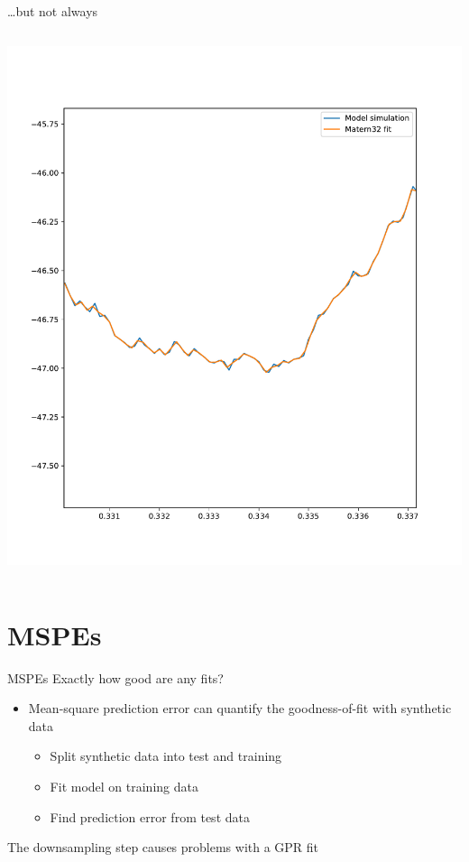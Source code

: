 \documentclass[presentation]{beamer}
\begin{document}
\begin{frame}[plain,label={sec:org973ac53}]{\ldots{}but not always}
\begin{columns}
\begin{column}{0.5\columnwidth}
\begin{center}
\includegraphics[width=1.1\textwidth]{./Matern6.pdf}
\end{center}
\end{column}
\end{columns}
\end{frame}


\section{MSPEs}
\label{sec:org2df4991}
\begin{frame}[label={sec:org1b1ddb2}]{MSPEs}
Exactly how good are any fits?
\vfill
\begin{itemize}
\item Mean-square prediction error can quantify the goodness-of-fit with synthetic data
\begin{itemize}
\item Split synthetic data into test and training
\item Fit model on training data
\item Find prediction error from test data
\end{itemize}
\end{itemize}

\vfill

The downsampling step causes problems with a GPR fit
\end{frame}
\end{document}
